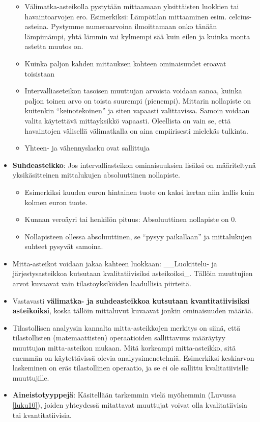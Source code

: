 \documentclass[
]{book}
\providecommand{\tightlist}{%
  \setlength{\itemsep}{0pt}\setlength{\parskip}{0pt}}
\begin{document}
\begin{itemize}
  \begin{itemize}
  \tightlist
  \item
    Välimatka-asteikolla pystytään mittaamaan yksittäisten luokkien tai havaintoarvojen ero. Esimerkiksi: Lämpötilan mittaaminen esim. celcius-asteina. Pystymme numeroarvoina ilmoittamaan onko tänään lämpimämpi, yhtä lämmin vai kylmempi sää kuin eilen ja kuinka monta astetta muutos on.
  \item
    Kuinka paljon kahden mittauksen kohteen ominaisuudet eroavat toisistaan
  \item
    Intervalliaseteikon tasoisen muuttujan arvoista voidaan sanoa, kuinka paljon toinen arvo on toista suurempi (pienempi). Mittarin nollapiste on kuitenkin ``keinotekoinen'' ja siten vapaasti valittavissa. Samoin voidaan valita käytettävä mittayksikkö vapaasti. Oleellista on vain se, että havaintojen välisellä välimatkalla on aina empiirisesti mielekäs tulkinta.
  \item
    Yhteen- ja vähennyslasku ovat sallittuja
  \end{itemize}
\item
  \textbf{Suhdeasteikko}: Jos intervalliasteikon ominaisuuksien lisäksi on määriteltynä yksikäsitteinen mittalukujen absoluuttinen nollapiste.

  \begin{itemize}
  \tightlist
  \item
    Esimerkiksi kuuden euron hintainen tuote on kaksi kertaa niin kallis kuin kolmen euron tuote.
  \item
    Kunnan veroäyri tai henkilön pituus: Absoluuttinen nollapiste on 0.
  \item
    Nollapisteen ollessa absoluuttinen, se ``pysyy paikallaan'' ja mittalukujen suhteet pysyvät samoina.
  \end{itemize}
\item
  Mitta-asteikot voidaan jakaa kahteen luokkaan: \_\_Luokittelu- ja järjestysasteikkoa kutsutaan kvalitatiivisiksi asteikoiksi\_. Tällöin muuttujien arvot kuvaavat vain tilastoyksiköiden laadullisia piirteitä.
\item
  Vastavasti \textbf{välimatka- ja suhdeasteikkoa kutsutaan kvantitatiivisiksi asteikoiksi}, koska tällöin mittaluvut kuvaavat jonkin ominaisuuden määrää.
\item
  Tilastollisen analyysin kannalta mitta-asteikkojen merkitys on siinä, että tilastollisten (matemaattisten) operaatioiden sallittavuus määräytyy muuttujan mitta-asteikon mukaan. Mitä korkeampi mitta-asteikko, sitä enemmän on käytettävissä olevia analyysimenetelmiä. Esimerkiksi keskiarvon laskeminen on eräs tilastollinen operaatio, ja se ei ole sallittu kvalitatiivislle muuttujille.
\item
  \textbf{Aineistotyyppejä}: Käsitellään tarkemmin vielä myöhemmin (Luvussa \ref{luku10}), joiden yhteydessä mitattavat muuttujat voivat olla kvalitatiivisia tai kvantitatiivisia.


\end{itemize}
\end{document}
